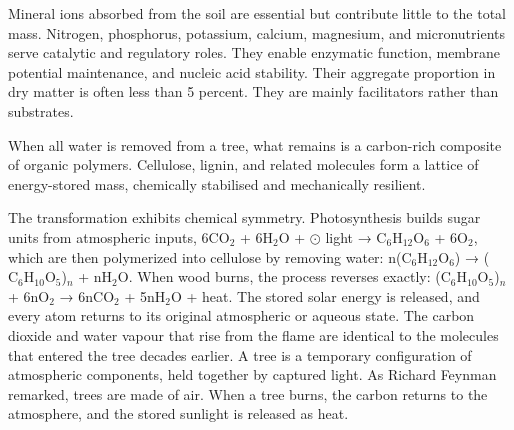 Mineral ions absorbed from the soil are essential but contribute little to the total mass. Nitrogen, phosphorus, potassium, calcium, magnesium, and micronutrients serve catalytic and regulatory roles. They enable enzymatic function, membrane potential maintenance, and nucleic acid stability. Their aggregate proportion in dry matter is often less than 5 percent. They are mainly facilitators rather than substrates.

When all water is removed from a tree, what remains is a carbon-rich composite of organic polymers. Cellulose, lignin, and related molecules form a lattice of energy-stored mass, chemically stabilised and mechanically resilient. 

The transformation exhibits chemical symmetry. Photosynthesis builds sugar units from atmospheric inputs, 6\(\mathrm{CO}_2\) + 6\(\mathrm{H}_2\mathrm{O}\) + \(\odot\) light → \(\mathrm{C}_6\mathrm{H}_{12}\mathrm{O}_6\) + 6\(\mathrm{O}_2\), which are then polymerized into cellulose by removing water: n(\(\mathrm{C}_6\mathrm{H}_{12}\mathrm{O}_6\)) → (\(\mathrm{C}_6\mathrm{H}_{10}\mathrm{O}_5\))\(_n\) + n\(\mathrm{H}_2\mathrm{O}\). When wood burns, the process reverses exactly: (\(\mathrm{C}_6\mathrm{H}_{10}\mathrm{O}_5\))\(_n\) + 6n\(\mathrm{O}_2\) → 6n\(\mathrm{CO}_2\) + 5n\(\mathrm{H}_2\mathrm{O}\) + \Fire{} heat. The stored solar energy is released, and every atom returns to its original atmospheric or aqueous state. The carbon dioxide and water vapour that rise from the flame are identical to the molecules that entered the tree decades earlier. A tree is a temporary configuration of atmospheric components, held together by captured light. As Richard Feynman remarked, trees are \QSOpen{}made of air\QSClose{}. When a tree burns, the carbon returns to the atmosphere, and the stored sunlight is released as heat.



